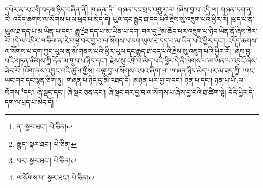 དཔེར་ན་རང་གི་བདག་ཉིད་བཞིན་ནོ། །གཞན་ནི་\footnote{ན་  སྣར་ཐང་།  པེ་ཅིན། }གཞན་དང་ཕྲད་འགྱུར་ན། །ཞེས་བྱ་བ་འདི་ལ། གཞན་དག་ན་རེ། འདོད་ཆགས་ལ་སོགས་པ་ལ་ཕྲད་པ་མེད་དེ། ཡུལ་དང་རྒྱུད་ཐ་དད་པའི་རྗེས་སུ་འཇུག་པའི་ཕྱིར་རོ། །ཕྲད་པ་ནི་ཡུལ་ཐ་དད་པ་མ་ཡིན་པ་དང་། རྒྱུ་\footnote{རྒྱུད་  སྣར་ཐང་།  པེ་ཅིན། }ཐ་དད་པ་མ་ཡིན་པ་དག་:བར་དུ་\footnote{བར་  སྣར་ཐང་།  པེ་ཅིན། }མ་ཆོད་པར་འཇུག་པ་ཉིད་ཡིན་ནོ་ཞེས་ཟེར་རོ། །དེ་ལ་འདིར་ཁ་ཅིག་ན་རེ་བལྟ་བར་བྱ་བ་ལ་སོགས་པ་དག་ཡུལ་ཐ་དད་པ་མ་ཡིན་པའི་ཕྱིར་དང་། འདོད་ཆགས་ལ་སོགས་པ་དག་ཀྱང་ཡུལ་ན་མི་གནས་པའི་ཕྱིར་ཡུལ་དང་རྒྱུད་ཐ་དད་པའི་རྗེས་སུ་འཇུག་པའི་ཕྱིར་རོ། །ཞེས་བྱ་བའི་གཏན་ཚིགས་ཀྱི་དོན་མ་གྲུབ་པ་ཉིད་དང་། རྗེས་སུ་འགྲོ་བ་མེད་པའི་ཕྱིར་དེ་ནི་ལེགས་པ་མ་ཡིན་པ་འདྲའོ་ཞེས་ཟེར་རོ། །འོག་ནས་འབྱུང་བའི་ཚུལ་གྱིས། བལྟ་བྱ་ལ་སོགས་འབའ་ཞིག་ལ། །གཞན་ཉིད་མེད་པར་མ་ཟད་ཀྱི། །གང་ཡང་གང་དང་ལྷན་ཅིག་ཏུ། །གཞན་པ་ཉིད་དུ་མི་འཐད་དོ། །མཉན་པར་བྱ་བ་དང་། ཉན་པ་དང་། ཉན་པ་པོ་:ལ་སོགས་\footnote{ལ་སོགས་པ་  སྣར་ཐང་།  པེ་ཅིན། }དང་། ཞེ་སྡང་དང་། ཞེ་སྡང་ཅན་དང་། ཞེ་སྡང་བར་བྱ་བ་ལ་སོགས་པ་ཞེས་བྱ་བའི་ཐ་ཚིག་སྟེ། དེའི་ཕྱིར་དེ་དག་ལ་ཕྲད་པ་མེད་དོ། །
